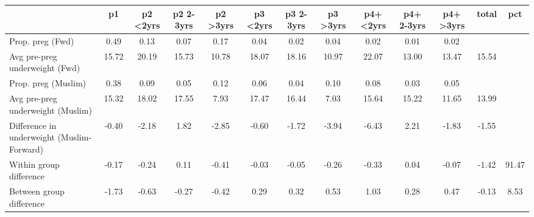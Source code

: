 \begin{tabular}{l*{12}{c}}
\toprule
            &\multicolumn{1}{c}{p1}&\multicolumn{1}{c}{p2 \textless2yrs}&\multicolumn{1}{c}{p2 2-3yrs}&\multicolumn{1}{c}{p2 \textgreater3yrs}&\multicolumn{1}{c}{p3 \textless2yrs}&\multicolumn{1}{c}{p3 2-3yrs}&\multicolumn{1}{c}{p3 \textgreater3yrs}&\multicolumn{1}{c}{p4+ \textless2yrs}&\multicolumn{1}{c}{p4+ 2-3yrs}&\multicolumn{1}{c}{p4+ \textgreater3yrs}&\multicolumn{1}{c}{total}&\multicolumn{1}{c}{pct}\\
\midrule
\midrule
Prop. preg (Fwd)&        0.49&        0.13&        0.07&        0.17&        0.04&        0.02&        0.04&        0.02&        0.01&        0.02&            &            \\
Avg pre-preg underweight (Fwd)&       15.72&       20.19&       15.73&       10.78&       18.07&       18.16&       10.97&       22.07&       13.00&       13.47&       15.54&            \\
Prop. preg (Muslim)&        0.38&        0.09&        0.05&        0.12&        0.06&        0.04&        0.10&        0.08&        0.03&        0.05&            &            \\
Avg pre-preg underweight (Muslim)&       15.32&       18.02&       17.55&        7.93&       17.47&       16.44&        7.03&       15.64&       15.22&       11.65&       13.99&            \\
Difference in underweight (Muslim-Forward)&       -0.40&       -2.18&        1.82&       -2.85&       -0.60&       -1.72&       -3.94&       -6.43&        2.21&       -1.83&       -1.55&            \\
Within group difference&       -0.17&       -0.24&        0.11&       -0.41&       -0.03&       -0.05&       -0.26&       -0.33&        0.04&       -0.07&       -1.42&       91.47\\
Between group difference&       -1.73&       -0.63&       -0.27&       -0.42&        0.29&        0.32&        0.53&        1.03&        0.28&        0.47&       -0.13&        8.53\\
\bottomrule
\end{tabular}
